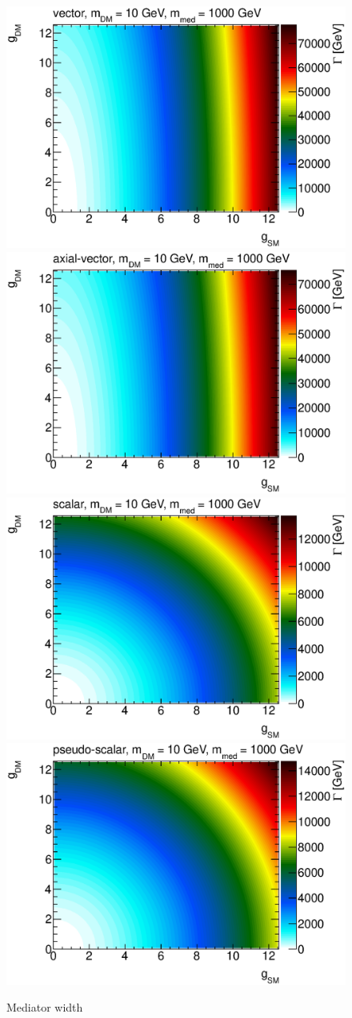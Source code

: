 \begin{figure}
\centering
\includegraphics[width=0.45\linewidth]{figures/monojet/constantwidth_V_gg1000.eps}
\includegraphics[width=0.45\linewidth]{figures/monojet/constantwidth_A_gg1000.eps}\\
\includegraphics[width=0.45\linewidth]{figures/monojet/constantwidth_S_gg1000.eps}
\includegraphics[width=0.45\linewidth]{figures/monojet/constantwidth_P_gg1000.eps}
\caption{Mediator width}
\label{fig:monojet_width1000}
\end{figure}

